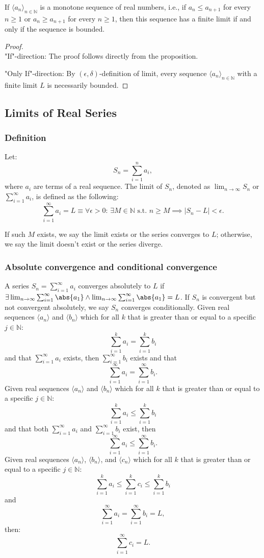 \documentclass[a4paper,12pt]{report}
\begin{document}
If $\langle a_n\rangle_{n\in\mathbb {N}}$ is a monotone sequence of real numbers, i.e., if 
$a_n\leq a_{n+1}$ for every $n\geq 1$ or $a_n\geq a_{n+1}$ for every $n\geq 1$, then this sequence has a finite limit if and only if the sequence is bounded.
\begin{proof}\mbox{}\\
"If"-direction: The proof follows directly from the proposition.

"Only If"-direction: By $(\epsilon,\delta)$-definition of limit, every sequence $\langle a_n\rangle_{n\in\mathbb {N}}$ with a finite limit $L$ is necessarily bounded.
\end{proof}
\subsection{Limits of Real Series}
\subsubsection{Definition}
Let:
\[S_n = \sum_{i=1}^n a_i,\]
where \(a_i\) are terms of a real sequence. The limit of \(S_n\), denoted as \(\lim_{n\to\infty}S_n\) or \(\sum_{i=1}^{\infty}a_i\), is defined as the following:
\[\sum_{i=1}^{\infty}a_i = L \equiv \forall \epsilon > 0:\, \exists M \in\mathbb{N}\text{\ s.t.\ } n \geq M\implies |S_n - L| < \epsilon.\]

If such $M$ exists, we say the limit exists or the series converges to $L$; otherwise, we say the limit doesn't exist or the series diverge.
\subsubsection{Absolute convergence and conditional convergence}
A series $S_n=\sum_{i=1}^{\infty}a_i$ converges absolutely to $L$ if $\exists\lim_{n\to\infty}\sum_{i=1}^{\infty}\abs{a_1}\land\lim_{n\to\infty}\sum_{i=1}^{\infty}\abs{a_1}=L$. If $S_n$ is convergent but not convergent absolutely, we say $S_n$ converges conditionally.
Given real sequences $\langle a_n\rangle$ and $\langle b_n\rangle$ which for all $k$ that is greater than or equal to a specific $j\in \mathbb{N}$:
\[\sum_{i=1}^ka_i=\sum_{i=1}^kb_i\]
and that $\sum_{i=1}^{\infty}a_i$ exists, then $\sum_{i=1}^{\infty}b_i$ exists and that
\[\sum_{i=1}^{\infty}a_i=\sum_{i=1}^{\infty}b_i.\]
Given real sequences $\langle a_n\rangle$ and $\langle b_n\rangle$ which for all $k$ that is greater than or equal to a specific $j\in \mathbb{N}$:
\[\sum_{i=1}^ka_i\leq\sum_{i=1}^kb_i\]
and that both $\sum_{i=1}^{\infty}a_i$ and $\sum_{i=1}^{\infty}b_i$ exist, then
\[\sum_{i=1}^{\infty}a_i\leq\sum_{i=1}^{\infty}b_i.\]
Given real sequences $\langle a_n\rangle$, $\langle b_n\rangle$, and $\langle c_n\rangle$ which for all $k$ that is greater than or equal to a specific $j\in \mathbb{N}$:
\[\sum_{i=1}^ka_i\leq\sum_{i=1}^kc_i\leq\sum_{i=1}^kb_i\]
and
\[\sum_{i=1}^{\infty}a_i=\sum_{i=1}^{\infty}b_i=L,\]
then: 
\[\sum_{i=1}^{\infty}c_i=L.\]
\end{document}

